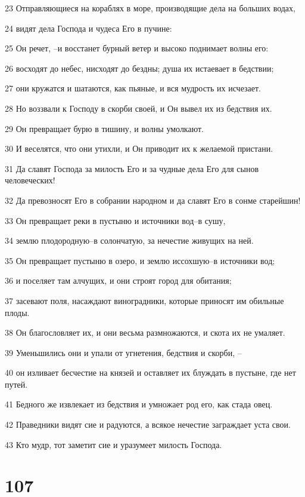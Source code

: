 \par 23 Отправляющиеся на кораблях в море, производящие дела на больших водах,
\par 24 видят дела Господа и чудеса Его в пучине:
\par 25 Он речет, --и восстанет бурный ветер и высоко поднимает волны его:
\par 26 восходят до небес, нисходят до бездны; душа их истаевает в бедствии;
\par 27 они кружатся и шатаются, как пьяные, и вся мудрость их исчезает.
\par 28 Но воззвали к Господу в скорби своей, и Он вывел их из бедствия их.
\par 29 Он превращает бурю в тишину, и волны умолкают.
\par 30 И веселятся, что они утихли, и Он приводит их к желаемой пристани.
\par 31 Да славят Господа за милость Его и за чудные дела Его для сынов человеческих!
\par 32 Да превозносят Его в собрании народном и да славят Его в сонме старейшин!
\par 33 Он превращает реки в пустыню и источники вод--в сушу,
\par 34 землю плодородную--в солончатую, за нечестие живущих на ней.
\par 35 Он превращает пустыню в озеро, и землю иссохшую--в источники вод;
\par 36 и поселяет там алчущих, и они строят город для обитания;
\par 37 засевают поля, насаждают виноградники, которые приносят им обильные плоды.
\par 38 Он благословляет их, и они весьма размножаются, и скота их не умаляет.
\par 39 Уменьшились они и упали от угнетения, бедствия и скорби, --
\par 40 он изливает бесчестие на князей и оставляет их блуждать в пустыне, где нет путей.
\par 41 Бедного же извлекает из бедствия и умножает род его, как стада овец.
\par 42 Праведники видят сие и радуются, а всякое нечестие заграждает уста свои.
\par 43 Кто мудр, тот заметит сие и уразумеет милость Господа.

\chapter{107}

